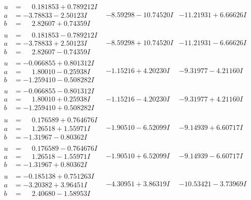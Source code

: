 \documentclass[1p]{elsarticle_modified}
\theoremstyle{definition}
\begin{document}
$$\begin{array}{c|c|c}
\begin{aligned}
u &= \phantom{-}0.181853 + 0.789212 I \\
a &= -3.78833 - 2.50123 I \\
b &= \phantom{-}2.82607 + 0.74359 I\end{aligned}
 & -8.59298 - 10.74520 I & -11.21931 + 6.66626 I \\ \hline\begin{aligned}
u &= \phantom{-}0.181853 - 0.789212 I \\
a &= -3.78833 + 2.50123 I \\
b &= \phantom{-}2.82607 - 0.74359 I\end{aligned}
 & -8.59298 + 10.74520 I & -11.21931 - 6.66626 I \\ \hline\begin{aligned}
u &= -0.066855 + 0.801312 I \\
a &= \phantom{-}1.80010 - 0.25938 I \\
b &= -1.259410 - 0.508282 I\end{aligned}
 & -1.15216 + 4.20230 I & -9.31977 - 4.21160 I \\ \hline\begin{aligned}
u &= -0.066855 - 0.801312 I \\
a &= \phantom{-}1.80010 + 0.25938 I \\
b &= -1.259410 + 0.508282 I\end{aligned}
 & -1.15216 - 4.20230 I & -9.31977 + 4.21160 I \\ \hline\begin{aligned}
u &= \phantom{-}0.176589 + 0.764676 I \\
a &= \phantom{-}1.26518 + 1.55971 I \\
b &= -1.31967 - 0.80362 I\end{aligned}
 & -1.90510 - 6.52099 I & -9.14939 + 6.60717 I \\ \hline\begin{aligned}
u &= \phantom{-}0.176589 - 0.764676 I \\
a &= \phantom{-}1.26518 - 1.55971 I \\
b &= -1.31967 + 0.80362 I\end{aligned}
 & -1.90510 + 6.52099 I & -9.14939 - 6.60717 I \\ \hline\begin{aligned}
u &= -0.185138 + 0.751263 I \\
a &= -3.20382 + 3.96451 I \\
b &= \phantom{-}2.40680 - 1.58953 I\end{aligned}
 & -4.30951 + 3.86319 I & -10.53421 - 3.73969 I \\ \hline\begin{aligned}

\end{aligned}
\end{array}$$
\end{document}
